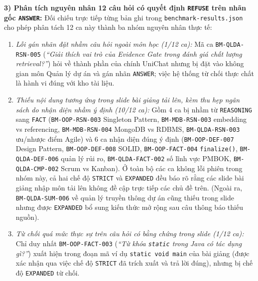 \documentclass{IEEEtran}
\begin{document}
\textbf{3) Phân tích nguyên nhân 12 câu hỏi có quyết định \texttt{REFUSE} trên nhãn gốc \texttt{ANSWER}:}
Đối chiếu trực tiếp từng bản ghi trong \texttt{benchmark-results.json} cho phép phân tách 12 ca này thành ba nhóm nguyên nhân thực tế:
\begin{enumerate}
    \item \textit{Lỗi gán nhãn đặt nhầm câu hỏi ngoài môn học (1/12 ca):} Mã ca \texttt{BM-QLDA-RSN-005} (\textit{``Giải thích vai trò của Evidence Gate trong đánh giá chất lượng retrieval?''}) hỏi về thành phần của chính UniChat nhưng bị đặt vào không gian môn Quản lý dự án và gán nhãn \texttt{ANSWER}; việc hệ thống từ chối thực chất là hành vi đúng với kho tài liệu.
    \item \textit{Thiếu nội dung tương ứng trong slide bài giảng tải lên, kèm thu hẹp ngân sách do nhận diện nhầm ý định (10/12 ca):} Gồm 4 ca bị nhầm từ \texttt{REASONING} sang \texttt{FACT} (\texttt{BM-OOP-RSN-003} Singleton Pattern, \texttt{BM-MDB-RSN-003} embedding vs referencing, \texttt{BM-MDB-RSN-004} MongoDB vs RDBMS, \texttt{BM-QLDA-RSN-003} ưu/nhược điểm Agile) và 6 ca nhận diện đúng ý định (\texttt{BM-OOP-DEF-007} Design Pattern, \texttt{BM-OOP-DEF-008} SOLID, \texttt{BM-OOP-FACT-004} \texttt{finalize()}, \texttt{BM-QLDA-DEF-006} quản lý rủi ro, \texttt{BM-QLDA-FACT-002} số lĩnh vực PMBOK, \texttt{BM-QLDA-CMP-002} Scrum vs Kanban). Ở toàn bộ các ca không lỗi phiên trong nhóm này, cả hai chế độ \texttt{STRICT} và \texttt{EXPANDED} đều báo rõ rằng các slide bài giảng nhập môn tải lên không đề cập trực tiếp các chủ đề trên. (Ngoài ra, \texttt{BM-QLDA-SUM-006} về quản lý truyền thông dự án cũng thiếu trong slide nhưng được \texttt{EXPANDED} bổ sung kiến thức mở rộng sau câu thông báo thiếu nguồn).
    \item \textit{Từ chối quá mức thực sự trên câu hỏi có bằng chứng trong slide (1/12 ca):} Chỉ duy nhất \texttt{BM-OOP-FACT-003} (\textit{``Từ khóa \texttt{static} trong Java có tác dụng gì?''}) xuất hiện trong đoạn mã ví dụ \texttt{static void main} của bài giảng (được xác nhận qua việc chế độ \texttt{STRICT} đã trích xuất và trả lời đúng), nhưng bị chế độ \texttt{EXPANDED} từ chối.
\end{enumerate}
\end{document}
